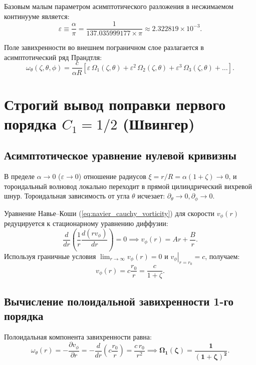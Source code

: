 \documentclass[12pt,a4paper]{article}
\begin{document}
	Базовым малым параметром асимптотического разложения в несжимаемом континууме является:
	\begin{equation}
		\varepsilon \equiv \frac{\alpha}{\pi} = \frac{1}{137.035999177 \times \pi} \approx 2.322819 \times 10^{-3}.
	\end{equation}
	
	Поле завихренности во внешнем пограничном слое разлагается в асимптотический ряд Прандтля:
	\begin{equation}
		\omega_\theta(\zeta, \theta, \phi) = \frac{c}{\alpha R} \left[ \varepsilon \, \Omega_1(\zeta, \theta) + \varepsilon^2 \, \Omega_2(\zeta, \theta) + \varepsilon^3 \, \Omega_3(\zeta, \theta) + \dots \right].
		\label{eq:prandtl_expansion}
	\end{equation}
	
	\section{Строгий вывод поправки первого порядка $C_1 = 1/2$ (Швингер)}
	
	\subsection{Асимптотическое уравнение нулевой кривизны}
	В пределе $\alpha \to 0$ ($\varepsilon \to 0$) отношение радиусов $\xi = r/R = \alpha(1+\zeta) \to 0$, и тороидальный волновод локально переходит в прямой цилиндрический вихревой шнур. Тороидальная зависимость от угла $\theta$ исчезает: $\partial_\theta \to 0, \partial_\phi \to 0$.
	
	Уравнение Навье--Коши (\ref{eq:navier_cauchy_vorticity}) для скорости $v_\phi(r)$ редуцируется к стационарному уравнению диффузии:
	\begin{equation}
		\frac{d}{dr}\left( \frac{1}{r} \frac{d(r v_\phi)}{dr} \right) = 0 \implies v_\phi(r) = A r + \frac{B}{r}.
	\end{equation}
	Используя граничные условия $\lim_{r \to \infty} v_\phi(r) = 0$ и $\left. v_\phi \right|_{r = r_0} = c$, получаем:
	\begin{equation}
		v_\phi(r) = c \frac{r_0}{r} = \frac{c}{1 + \zeta}.
	\end{equation}
	
	\subsection{Вычисление полоидальной завихренности 1-го порядка}
	Полоидальная компонента завихренности равна:
	\begin{equation}
		\omega_\theta(r) = -\frac{\partial v_\phi}{\partial r} = -\frac{d}{dr}\left( c \frac{r_0}{r} \right) = \frac{c \, r_0}{r^2} \implies \mathbf{\Omega_1(\zeta) = \frac{1}{(1 + \zeta)^2}}.
	\end{equation}
	
\end{document}
